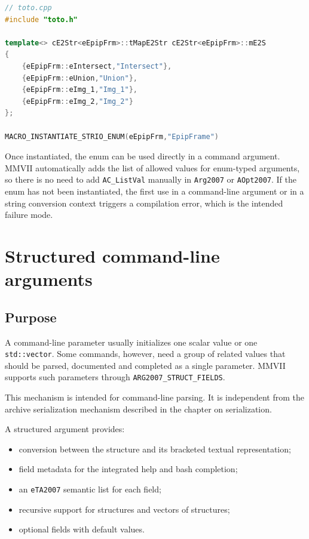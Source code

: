 \begin{lstlisting}[language=C++]
// toto.cpp
#include "toto.h"

template<> cE2Str<eEpipFrm>::tMapE2Str cE2Str<eEpipFrm>::mE2S
{
    {eEpipFrm::eIntersect,"Intersect"},
    {eEpipFrm::eUnion,"Union"},
    {eEpipFrm::eImg_1,"Img_1"},
    {eEpipFrm::eImg_2,"Img_2"}
};

MACRO_INSTANTIATE_STRIO_ENUM(eEpipFrm,"EpipFrame")
\end{lstlisting}

Once instantiated, the enum can be used directly in a command argument.  MMVII
automatically adds the list of allowed values for enum-typed arguments, so there
is no need to add \texttt{AC\_ListVal} manually in \texttt{Arg2007} or
\texttt{AOpt2007}.  If the enum has not been instantiated, the first use in a
command-line argument or in a string conversion context triggers a compilation
error, which is the intended failure mode.


\section{Structured command-line arguments}

\subsection{Purpose}

A command-line parameter usually initializes one scalar value or one
\texttt{std::vector}.  Some commands, however, need a group of related values that
should be parsed, documented and completed as a single parameter.  MMVII supports
such parameters through \texttt{ARG2007\_STRUCT\_FIELDS}.

This mechanism is intended for command-line parsing.  It is independent from the
archive serialization mechanism described in the chapter on serialization.

A structured argument provides:

\begin{itemize}
  \item conversion between the structure and its bracketed textual representation;
  \item field metadata for the integrated help and bash completion;
  \item an \texttt{eTA2007} semantic list for each field;
  \item recursive support for structures and vectors of structures;
  \item optional fields with default values.
\end{itemize}

